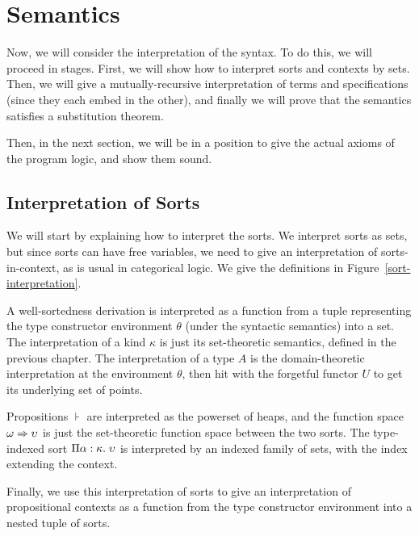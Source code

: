 \section{Semantics}

Now, we will consider the interpretation of the syntax. To do this, we
will proceed in stages. First, we will show how to interpret sorts and
contexts by sets. Then, we will give a mutually-recursive
interpretation of terms and specifications (since they each embed in
the other), and finally we will prove that the semantics satisfies a 
substitution theorem. 

Then, in the next section, we will be in a position to give the actual
axioms of the program logic, and show them sound. 

\subsection{Interpretation of Sorts}

We will start by explaining how to interpret the sorts. We interpret
sorts as sets, but since sorts can have free variables, we need to
give an interpretation of sorts-in-context, as is usual in categorical
logic. We give the definitions in Figure~\ref{sort-interpretation}.

A well-sortedness derivation is interpreted as a function from a tuple
representing the type constructor environment $\theta$ (under the
syntactic semantics) into a set. The interpretation of a kind $\kappa$
is just its set-theoretic semantics, defined in the previous
chapter. The interpretation of a type $A$ is the domain-theoretic
interpretation at the environment $\theta$, then hit with the
forgetful functor $U$ to get its underlying set of points.  

Propositions $\assert$ are interpreted as the powerset of heaps, and
the function space $\omega \Rightarrow \upsilon$ is just the set-theoretic
function space between the two sorts. The type-indexed sort
$\Pi {\alpha}:{\kappa}.\;{\upsilon}$ is interpreted by an indexed
family of sets, with the index extending the context.

Finally, we use this interpretation of sorts to give an interpretation
of propositional contexts as a function from the type constructor
environment into a nested tuple of sorts.


